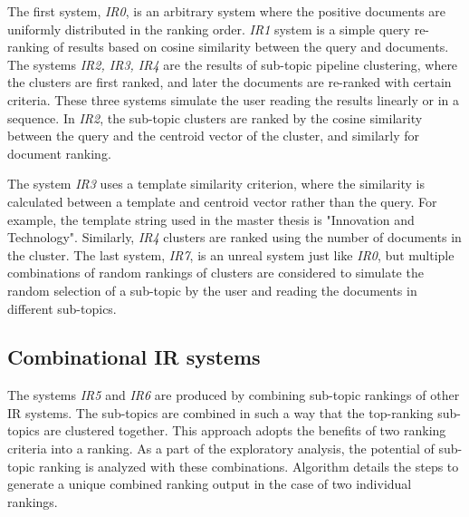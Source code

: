 The first system, \textit{IR0}, is an arbitrary system where the positive documents are uniformly distributed in the ranking order. \textit{IR1} system is a simple query re-ranking of results based on cosine similarity between the query and documents. The systems \textit{IR2, IR3, IR4} are the results of sub-topic pipeline clustering, where the clusters are first ranked, and later the documents are re-ranked with certain criteria. These three systems simulate the user reading the results linearly or in a sequence. In \textit{IR2}, the sub-topic clusters are ranked by the cosine similarity between the query and the centroid vector of the cluster, and similarly for document ranking.


The system \textit{IR3} uses a template similarity criterion, where the similarity is calculated between a template and centroid vector rather than the query. For example, the template string used in the master thesis is "Innovation and Technology". Similarly, \textit{IR4} clusters are ranked using the number of documents in the cluster. The last system, \textit{IR7}, is an unreal system just like \textit{IR0}, but multiple combinations of random rankings of clusters are considered to simulate the random selection of a sub-topic by the user and reading the documents in different sub-topics.


\subsection{Combinational IR systems}

The systems \textit{IR5} and \textit{IR6} are produced by combining sub-topic rankings of other \ac{IR} systems. The sub-topics are combined in such a way that the top-ranking sub-topics are clustered together. This approach adopts the benefits of two ranking criteria into a ranking. As a part of the exploratory analysis, the potential of sub-topic ranking is analyzed with these combinations. Algorithm  details the steps to generate a unique combined ranking output in the case of two individual rankings.


